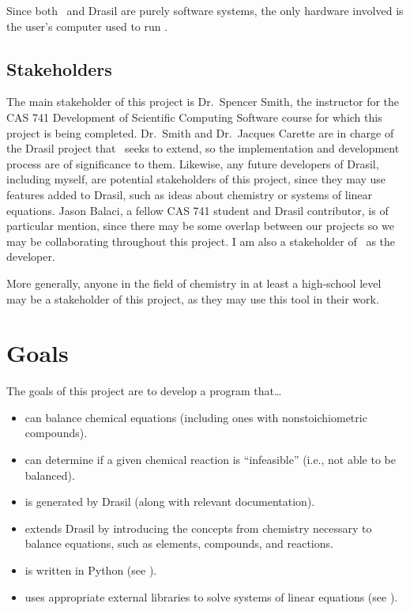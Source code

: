\documentclass{article}
\begin{document}
Since both \progname~and Drasil are purely software systems, the only
hardware involved is the user's computer used to run \progname.

\subsection{Stakeholders} \label{stkhlds}
The main stakeholder of this project is Dr.~Spencer Smith, the instructor for
the CAS 741 Development of Scientific Computing Software course for which this
project is being completed. Dr.~Smith and Dr.~Jacques Carette are in charge of
the Drasil project that \progname~seeks to extend, so the implementation and
development process are of significance to them. Likewise, any future
developers of Drasil, including myself, are
potential stakeholders of this project, since they may use features added to
Drasil, such as ideas about chemistry or systems of linear equations. Jason
Balaci, a fellow CAS 741 student and Drasil contributor, is of particular
mention, since
there may be some overlap between our projects so we may be collaborating
throughout this project. I am also a stakeholder of \progname~as the
developer.

More generally, anyone in the field of chemistry in at least a high-school level
may be a stakeholder of this project, as they may use this tool in their work.

\section{Goals}

The goals of this project are to develop a program that\dots

\begin{itemize}
	\item can balance chemical equations (including ones with nonstoichiometric
	      compounds).
	\item can determine if a given chemical reaction is ``infeasible'' (i.e.,
	      not able to be balanced).
	\item is generated by Drasil (along with relevant documentation).
	\item extends Drasil by introducing the concepts from chemistry necessary
	      to balance equations, such as elements, compounds, and reactions.
	\item is written in Python (see ).
	\item uses appropriate external libraries to
	      solve systems of linear equations (see \cite[Ch. 4]{chen_solving_2022}).
\end{itemize}
\end{document}
